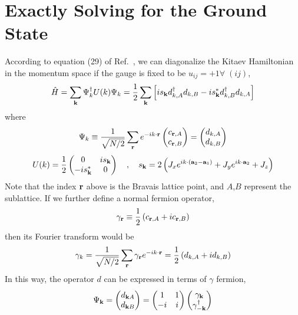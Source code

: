 \section{Exactly Solving for the Ground State}
According to equation (29) of Ref.~\cite{Kitaev_2006}, we can diagonalize the Kitaev Hamiltonian in the momentum space if the gauge is fixed to be $u_{ij} = +1\forall\; (ij)$, 
\[\hat{H} = \sum_{\mathbf{k}}\Psi^\dagger_{k}U(k)\Psi_{k} = \frac{1}{2}\sum_{\mathbf{k}}\left[ is_{\mathbf{k}}d_{k,A}^\dagger d_{k,B} - is_{\mathbf{k}}^*d_{k,B}^\dagger d_{k,A} \right]\]
where
\begin{equation}\label{eq:spinor-def}
    \Psi_k \equiv \frac{1}{\sqrt{N/2}}\sum_{\mathbf{r}}e^{-ik\cdot \mathbf{r}}\begin{pmatrix}
        c_{\mathbf{r},A} \\
        c_{\mathbf{r},B}
       \end{pmatrix} 
       = 
       \begin{pmatrix}
         d_{k,A} \\
         d_{k,B}
       \end{pmatrix}
\end{equation}
\[U(k) = \frac{1}{2}\begin{pmatrix}
                      0 & is_{\mathbf{k}} \\
                      -is_{\mathbf{k}}^* & 0 
                    \end{pmatrix} \quad , \quad s_{\mathbf{k}} = 2\left( J_xe^{ik\cdot \left( \mathbf{a}_2 - \mathbf{a}_1 \right)} + J_ye^{ik\cdot \mathbf{a}_2} + J_z \right)\]
Note that the index $\mathbf{r}$ above is the Bravais lattice point, and $A$,$B$ represent the sublattice. If we further define a normal fermion operator, 
\begin{equation}\label{gamm def.e}
  \gamma_{\mathbf{r}} \equiv \frac{1}{2}\left( c_{{\mathbf{r}},A} + ic_{{\mathbf{r}},B} \right)
\end{equation}
 then its Fourier transform would be 
\[\gamma_{k} = \frac{1}{\sqrt{N/2}}\sum_{{\mathbf{r}}}\gamma_{{\mathbf{r}}}e^{-ik\cdot \mathbf{r}} = \frac{1}{2}\left( d_{k,A} + id_{k,B} \right)\]
In this way, the operator $d$ can be expressed in terms of $\gamma$ fermion,
\begin{equation}\label{eq:d-gamma-transform}
    \Psi_{\mathbf{k}}
    =
    \begin{pmatrix}
        d_{\mathbf{k}A} \\
        d_{\mathbf{k}B}
    \end{pmatrix}
    =
    \begin{pmatrix}
        1 & 1 \\
        -i & i
    \end{pmatrix}
    \begin{pmatrix}
        \gamma_{\mathbf{k}} \\
        \gamma^\dagger_{-\mathbf{k}}
    \end{pmatrix}
\end{equation}
